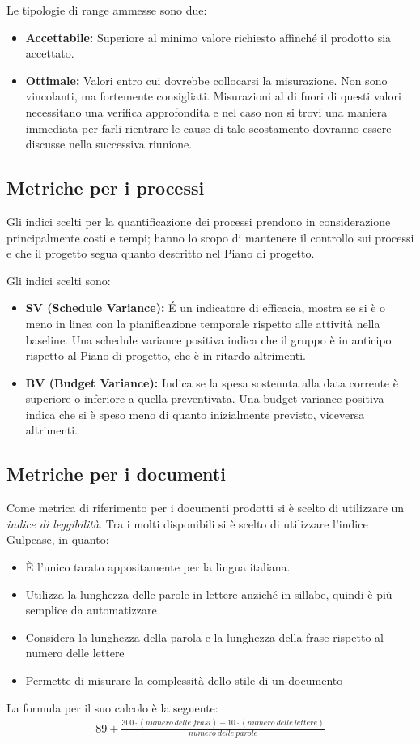 \documentclass[a4paper]{report}
\begin{document}
			Le tipologie di range ammesse sono due:
			\begin{itemize}
				\item \textbf{Accettabile:} Superiore al minimo valore richiesto affinché il prodotto sia accettato.
				\item \textbf{Ottimale:} Valori entro cui dovrebbe collocarsi la misurazione. Non sono vincolanti,
				ma fortemente consigliati. Misurazioni al di fuori di questi valori necessitano una verifica approfondita e nel
				caso non si trovi una maniera immediata per farli rientrare le cause di tale scostamento dovranno essere
				discusse nella successiva riunione.
			\end{itemize}
			\subsection{Metriche per i processi}
				Gli indici scelti per la quantificazione dei processi prendono in considerazione principalmente costi e tempi;
				hanno lo scopo di mantenere il controllo sui processi e che il progetto segua quanto descritto nel Piano di
				progetto.
				
				Gli indici scelti sono:
				\begin{itemize}
					\item \textbf{SV (Schedule Variance):} É un indicatore di efficacia, mostra se si è o meno in linea con la
					pianificazione temporale rispetto alle attività nella baseline. Una schedule variance positiva indica che il
					gruppo è in anticipo rispetto al Piano di progetto, che è in ritardo altrimenti.
					\item \textbf{BV (Budget Variance):} Indica se la spesa sostenuta alla data corrente è superiore o inferiore a
					quella preventivata. Una budget variance positiva indica che si è speso meno di quanto inizialmente previsto,
					viceversa altrimenti.		
				\end{itemize}
				
				
			\subsection{Metriche per i documenti}
				Come metrica di riferimento per i documenti prodotti si è scelto di utilizzare un \emph{indice di leggibilità}.
				Tra i molti disponibili si è scelto di utilizzare l'indice Gulpease, in quanto:
				\begin{itemize}
					\item È l'unico tarato appositamente per la lingua italiana.
					\item Utilizza la lunghezza delle parole in lettere anziché in sillabe, quindi è più semplice da automatizzare
					\item Considera la lunghezza della parola e la lunghezza della frase rispetto al numero delle lettere
					\item Permette di misurare la complessità dello stile di un documento
				\end{itemize}
				La formula per il suo calcolo è la seguente:
				\begin{align*}
					89+\frac{300\cdot(numero\ delle\ frasi)-10\cdot(numero\ delle\ lettere)}{numero\ delle\ parole}
				\end{align*}
				
\end{document}
